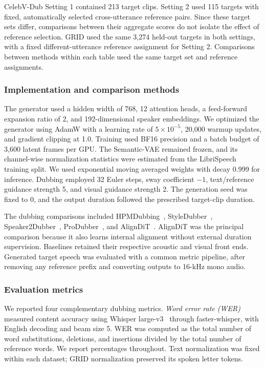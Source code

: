 CelebV-Dub Setting 1 contained 213 target clips. Setting 2 used 115 targets with fixed, automatically selected cross-utterance reference pairs. Since these target sets differ, comparisons between their aggregate scores do not isolate the effect of reference selection. GRID used the same 3,274 held-out targets in both settings, with a fixed different-utterance reference assignment for Setting 2. Comparisons between methods within each table used the same target set and reference assignments.

\subsubsection{Implementation and comparison methods}

The generator used a hidden width of 768, 12 attention heads, a feed-forward expansion ratio of 2, and 192-dimensional speaker embeddings. We optimized the generator using AdamW with a learning rate of $5\times10^{-5}$, 20,000 warmup updates, and gradient clipping at 1.0. Training used BF16 precision and a batch budget of 3,600 latent frames per GPU. The Semantic-VAE remained frozen, and its channel-wise normalization statistics were estimated from the LibriSpeech training split. We used exponential moving averaged weights with decay 0.999 for inference. Dubbing employed 32 Euler steps, sway coefficient $-1$, text/reference guidance strength 5, and visual guidance strength 2. The generation seed was fixed to 0, and the output duration followed the prescribed target-clip duration.

The dubbing comparisons included HPMDubbing~\cite{cong2023hpmdubbing}, StyleDubber~\cite{cong2024styledubber}, Speaker2Dubber~\cite{zhang2024speaker2dubber}, ProDubber~\cite{zhang2025produbber}, and AlignDiT~\cite{choi2025aligndit}. AlignDiT was the principal comparison because it also learns internal alignment without external duration supervision. Baselines retained their respective acoustic and visual front ends. Generated target speech was evaluated with a common metric pipeline, after removing any reference prefix and converting outputs to 16-kHz mono audio.

\subsubsection{Evaluation metrics}

We reported four complementary dubbing metrics. \emph{Word error rate (WER)} measured content accuracy using Whisper large-v3~\cite{radford2023whisper} through faster-whisper, with English decoding and beam size 5. WER was computed as the total number of word substitutions, deletions, and insertions divided by the total number of reference words. We report percentages throughout. Text normalization was fixed within each dataset; GRID normalization preserved its spoken letter tokens.

